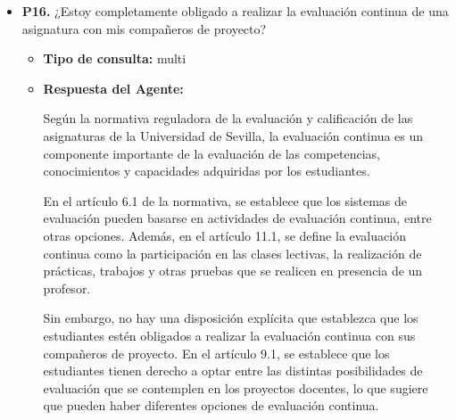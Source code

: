 \documentclass{article}
\begin{document}
\begin{itemize}
\begin{itemize}
\begin{scriptsize}
                  2. Solo en los casos de simultaneidad entre estudios de grado ya iniciados en la Universidad de Sevilla con otros en los que haya obtenido plaza en otra universidad española, el estudiante deberá abonar los derechos de traslado de expediente a efectos de simultaneidad en el centro de origen y entregar dicho resguardo en el centro de destino. El incumplimiento de este requisito dará lugar a la anulación de la matrícula. Los centros implicados deberán dejar constancia del traslado por simultaneidad en el expediente del estudiante.

                  Código Seguro De Verificación: `eqOjhZcmL0p6VJlZiTH/Yw==`
                  Fecha: 27/06/2025
                  Firmado Por: MIGUEL ANGEL CASTRO ARROYO
                  Url De Verificación: [https://pfirma.us.es/verifirma/code/eqOjhZcmL0p6VJlZiTH\%2FYw\%3D\%3D](https://pfirma.us.es/verifirma/code/eqOjhZcmL0p6VJlZiTH\%2FYw\%3D\%3D)
                  Página: 10/50
                \end{scriptsize}
        \end{itemize}


  \item \textbf{P16.} ¿Estoy completamente obligado a realizar la evaluación continua de una asignatura con mis compañeros de proyecto? \\
        \begin{itemize}
          \item \textbf{Tipo de consulta:} multi
          \item \textbf{Respuesta del Agente:}

                Según la normativa reguladora de la evaluación y calificación de las asignaturas de la Universidad de Sevilla, la evaluación continua es un componente importante de la evaluación de las competencias, conocimientos y capacidades adquiridas por los estudiantes.

                En el artículo 6.1 de la normativa, se establece que los sistemas de evaluación pueden basarse en actividades de evaluación continua, entre otras opciones. Además, en el artículo 11.1, se define la evaluación continua como la participación en las clases lectivas, la realización de prácticas, trabajos y otras pruebas que se realicen en presencia de un profesor.

                Sin embargo, no hay una disposición explícita que establezca que los estudiantes estén obligados a realizar la evaluación continua con sus compañeros de proyecto. En el artículo 9.1, se establece que los estudiantes tienen derecho a optar entre las distintas posibilidades de evaluación que se contemplen en los proyectos docentes, lo que sugiere que pueden haber diferentes opciones de evaluación continua.


\end{itemize}
\end{itemize}
\end{document}
